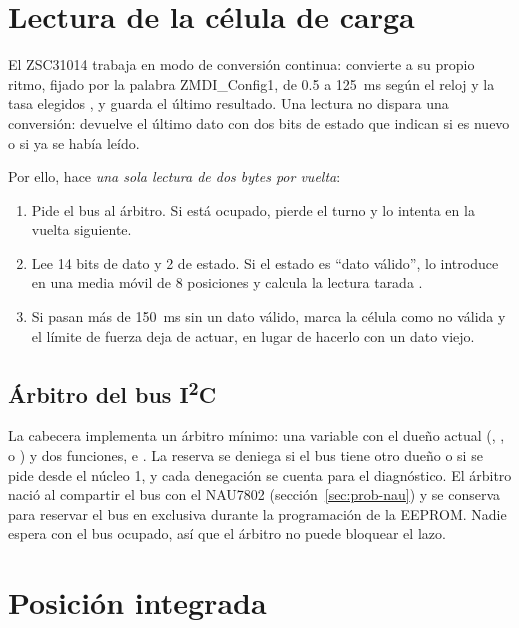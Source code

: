 \section{Lectura de la célula de carga}

El ZSC31014 trabaja en modo de conversión continua: convierte a su propio ritmo, fijado por la
palabra ZMDI\_Config1, de \num{0.5} a \SI{125}{\milli\second} según el reloj y la tasa elegidos
\cite{zsc31014}, y guarda el último resultado. Una lectura no dispara una conversión: devuelve el
último dato con dos bits de estado que indican si es nuevo o si ya se había leído.

Por ello,  hace \emph{una sola lectura de dos bytes por vuelta}:
\begin{enumerate}
  \item Pide el bus al árbitro. Si está ocupado, pierde el turno y lo intenta en la vuelta
        siguiente.
  \item Lee 14 bits de dato y 2 de estado. Si el estado es ``dato válido'', lo introduce en una
        media móvil de 8 posiciones y calcula la lectura tarada
        .
  \item Si pasan más de \SI{150}{\milli\second} sin un dato válido, marca la célula como no válida y
        el límite de fuerza deja de actuar, en lugar de hacerlo con un dato viejo.
\end{enumerate}

\subsection{Árbitro del bus I\textsuperscript{2}C}

La cabecera  implementa un árbitro mínimo: una variable con el dueño actual
(, ,  o ) y dos funciones,
 e . La reserva se deniega si el bus tiene otro dueño o si se
pide desde el núcleo 1, y cada denegación se cuenta para el diagnóstico. El árbitro nació al
compartir el bus con el NAU7802 (sección~\ref{sec:prob-nau}) y se conserva para reservar el bus en
exclusiva durante la programación de la EEPROM. Nadie espera con el bus ocupado, así que el árbitro
no puede bloquear el lazo.

\section{Posición integrada}
\label{sec:fw-posicion}

